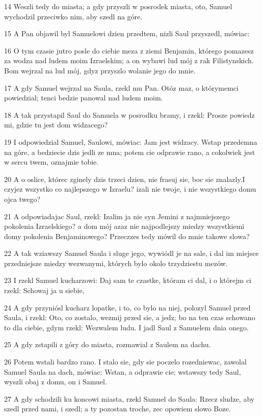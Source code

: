 \par 14 Weszli tedy do miasta; a gdy przyszli w posrodek miasta, oto, Samuel wychodzil przeciwko nim, aby szedl na góre.
\par 15 A Pan objawil byl Samuelowi dzien przedtem, nizli Saul przyszedl, mówiac:
\par 16 O tym czasie jutro posle do ciebie meza z ziemi Benjamin, którego pomazesz za wodza nad ludem moim Izraelskim; a on wybawi lud mój z rak Filistynskich. Bom wejrzal na lud mój, gdyz przyszlo wolanie jego do mnie.
\par 17 A gdy Samuel wejrzal na Saula, rzekl mu Pan. Otóz maz, o którymemci powiedzial; tenci bedzie panowal nad ludem moim.
\par 18 A tak przystapil Saul do Samuela w posrodku bramy, i rzekl: Prosze powiedz mi, gdzie tu jest dom widzacego?
\par 19 I odpowiedzial Samuel, Saulowi, mówiac: Jam jest widzacy. Wstap przedemna na góre, a bedziecie dzis jedli ze mna; potem cie odprawie rano, a cokolwiek jest w sercu twem, oznajmie tobie.
\par 20 A o oslice, którec zginely dzis trzeci dzien, nie frasuj sie, boc sie znalazly.I czyjez wszystko co najlepszego w Izraelu? izali nie twoje, i nie wszystkiego domu ojca twego?
\par 21 A odpowiadajac Saul, rzekl: Izalim ja nie syn Jemini z najmniejszego pokolenia Izraelskiego? a dom mój azaz nie najpodlejszy miedzy wszystkiemi domy pokolenia Benjaminowego? Przeczzes tedy mówil do mnie takowe slowa?
\par 22 A tak wziawszy Samuel Saula i sluge jego, wywiódl je na sale, i dal im miejsce przedniejsze miedzy wezwanymi, których bylo okolo trzydziestu mezów.
\par 23 I rzekl Samuel kucharzowi: Daj sam te czastke, któram ci dal, i o którejm ci rzekl: Schowaj ja u siebie,
\par 24 A gdy przyniósl kucharz lopatke, i to, co bylo na niej, polozyl Samuel przed Saula, i rzekl: Oto, co zostalo, wezmij przed sie, a jedz; bo na ten czas schowano to dla ciebie, gdym rzekl: Wezwalem ludu. I jadl Saul z Samuelem dnia onego.
\par 25 A gdy zstapili z góry do miasta, rozmawial z Saulem na dachu.
\par 26 Potem wstali bardzo rano. I stalo sie, gdy sie poczelo rozedniewac, zawolal Samuel Saula na dach, mówiac: Wstan, a odprawie cie; wstawszy tedy Saul, wyszli obaj z domu, on i Samuel.
\par 27 A gdy schodzili ku koncowi miasta, rzekl Samuel do Saula: Rzecz sludze, aby szedl przed nami, i szedl; a ty pozostan troche, zec opowiem slowo Boze.

